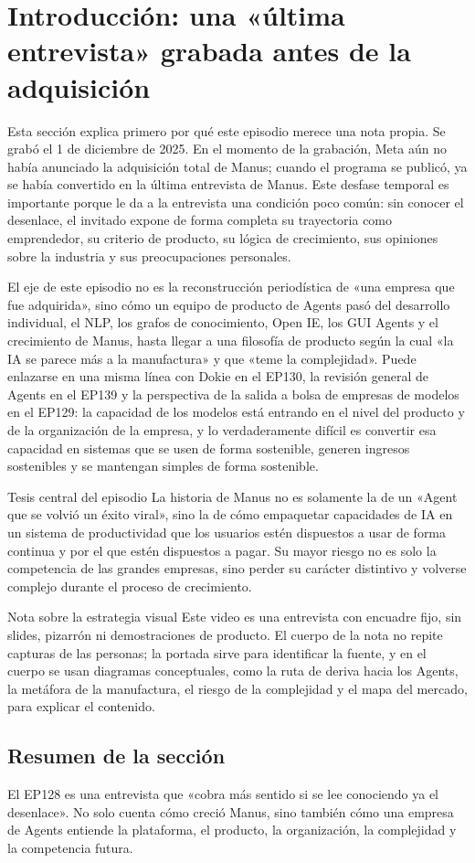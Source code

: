 \section{Introducción: una «última entrevista» grabada antes de la adquisición}

Esta sección explica primero por qué este episodio merece una nota propia. Se grabó el 1 de diciembre de 2025. En el momento de la grabación, Meta aún no había anunciado la adquisición total de Manus; cuando el programa se publicó, ya se había convertido en la última entrevista de Manus. Este desfase temporal es importante porque le da a la entrevista una condición poco común: sin conocer el desenlace, el invitado expone de forma completa su trayectoria como emprendedor, su criterio de producto, su lógica de crecimiento, sus opiniones sobre la industria y sus preocupaciones personales.

El eje de este episodio no es la reconstrucción periodística de «una empresa que fue adquirida», sino cómo un equipo de producto de Agents pasó del desarrollo individual, el NLP, los grafos de conocimiento, Open IE, los GUI Agents y el crecimiento de Manus, hasta llegar a una filosofía de producto según la cual «la IA se parece más a la manufactura» y que «teme la complejidad». Puede enlazarse en una misma línea con Dokie en el EP130, la revisión general de Agents en el EP139 y la perspectiva de la salida a bolsa de empresas de modelos en el EP129: la capacidad de los modelos está entrando en el nivel del producto y de la organización de la empresa, y lo verdaderamente difícil es convertir esa capacidad en sistemas que se usen de forma sostenible, generen ingresos sostenibles y se mantengan simples de forma sostenible.

\begin{importantbox}{Tesis central del episodio}
La historia de Manus no es solamente la de un «Agent que se volvió un éxito viral», sino la de cómo empaquetar capacidades de IA en un sistema de productividad que los usuarios estén dispuestos a usar de forma continua y por el que estén dispuestos a pagar. Su mayor riesgo no es solo la competencia de las grandes empresas, sino perder su carácter distintivo y volverse complejo durante el proceso de crecimiento.
\end{importantbox}

\begin{knowledgebox}{Nota sobre la estrategia visual}
Este video es una entrevista con encuadre fijo, sin slides, pizarrón ni demostraciones de producto. El cuerpo de la nota no repite capturas de las personas; la portada sirve para identificar la fuente, y en el cuerpo se usan diagramas conceptuales, como la ruta de deriva hacia los Agents, la metáfora de la manufactura, el riesgo de la complejidad y el mapa del mercado, para explicar el contenido.
\end{knowledgebox}

\subsection{Resumen de la sección}

El EP128 es una entrevista que «cobra más sentido si se lee conociendo ya el desenlace». No solo cuenta cómo creció Manus, sino también cómo una empresa de Agents entiende la plataforma, el producto, la organización, la complejidad y la competencia futura.
